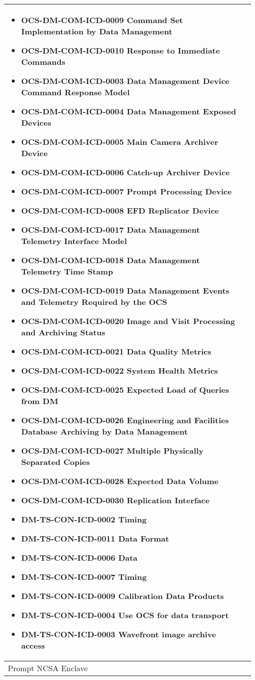 \begin{xtabular}{lp{0.7\textwidth}}
\begin{itemize}
\item OCS-DM-COM-ICD-0009 Command Set Implementation by Data Management
\item OCS-DM-COM-ICD-0010 Response to Immediate Commands
\item OCS-DM-COM-ICD-0003 Data Management Device Command Response Model
\item OCS-DM-COM-ICD-0004 Data Management Exposed Devices
\item OCS-DM-COM-ICD-0005 Main Camera Archiver Device
\item OCS-DM-COM-ICD-0006 Catch-up Archiver Device
\item OCS-DM-COM-ICD-0007 Prompt Processing Device
\item OCS-DM-COM-ICD-0008 EFD Replicator Device
\item OCS-DM-COM-ICD-0017 Data Management Telemetry Interface Model
\item OCS-DM-COM-ICD-0018 Data Management Telemetry Time Stamp
\item OCS-DM-COM-ICD-0019 Data Management Events and Telemetry Required by the OCS
\item OCS-DM-COM-ICD-0020 Image and Visit Processing and Archiving Status
\item OCS-DM-COM-ICD-0021 Data Quality Metrics
\item OCS-DM-COM-ICD-0022 System Health Metrics
\item OCS-DM-COM-ICD-0025 Expected Load of Queries from DM
\item OCS-DM-COM-ICD-0026 Engineering and Facilities Database Archiving by Data Management
\item OCS-DM-COM-ICD-0027 Multiple Physically Separated Copies
\item OCS-DM-COM-ICD-0028 Expected Data Volume
\item OCS-DM-COM-ICD-0030 Replication Interface
\item DM-TS-CON-ICD-0002 Timing
\item DM-TS-CON-ICD-0011 Data Format
\item DM-TS-CON-ICD-0006 Data
\item DM-TS-CON-ICD-0007 Timing
\item DM-TS-CON-ICD-0009 Calibration Data Products
\item DM-TS-CON-ICD-0004 Use OCS for data transport
\item DM-TS-CON-ICD-0003 Wavefront image archive access
\end{itemize} \\ \hline
Prompt NCSA Enclave &

\end{xtabular}
